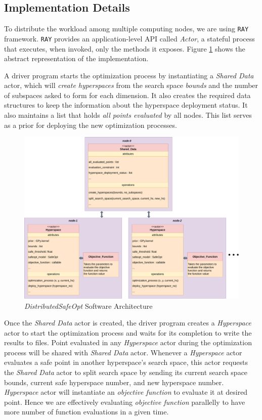 \clearpage
\subsection{Implementation Details}
\label{subsec:dsbo-impl}

To distribute the workload among multiple computing nodes, we are using \texttt{RAY} \cite{ray.framework} framework. \texttt{RAY} provides an application-level API called \textit{Actor}, a stateful process that executes, when invoked, only the methods it exposes. Figure \ref{fig:dsbo-architecture} shows the abstract representation of the implementation.

A driver program starts the optimization process by instantiating a \textit{Shared Data} actor, which will \textit{create hyperspaces} from the search space \textit{bounds} and the number of subspaces asked to form for each dimension. It also creates the required data structures to keep the information about the hyperspace deployment status. It also maintains a list that holds \textit{all points evaluated} by all nodes. This list serves as a prior for deploying the new optimization processes.

\begin{figure}[h!]
	\centering
	\hspace*{-5em}
	\includegraphics[scale=0.3]{figures/dbo-architecture.pdf}
	\caption{\textit{DistributedSafeOpt} Software Architecture}
	\label{fig:dsbo-architecture}
\end{figure}
Once the \textit{Shared Data} actor is created, the driver program creates a \textit{Hyperspace} actor to start the optimization process and waits for its completion to write the results to files. Point evaluated in any \textit{Hyperspace} actor during the optimization process will be shared with \textit{Shared Data} actor. 
Whenever a \textit{Hyperspace} actor evaluates a safe point in another hyperspace's search space, this actor requests the \textit{Shared Data} actor to split search space by sending its current search space bounds, current safe hyperspace number, and new hyperspace number. \textit{Hyperspace} actor will instantiate an \textit{objective function} to evaluate it at desired point. Hence we are effectively evaluating \textit{objective function} parallelly to have more number of function evaluations in a given time. 


